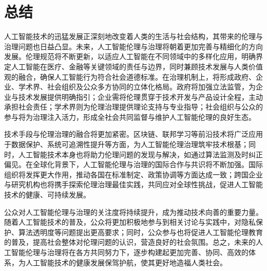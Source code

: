 \section{总结}

人工智能技术的迅猛发展正深刻地改变着人类的生活与社会结构，其带来的伦理与治理问题也日益凸显。未来，人工智能伦理与治理将朝着更加完善与精细化的方向发展。伦理规范将不断更新，以适应人工智能在不同领域中的多样化应用，明确界定人工智能在医疗、金融等关键领域的责任与边界，同时兼顾技术发展与人类价值观的融合，确保人工智能行为符合社会道德标准。在治理机制上，将形成政府、企业、学术界、社会组织及公众多方协同的立体化格局。政府将加强立法监管，为企业与技术发展提供明确指引；企业需将伦理贯穿于技术开发与产品设计全程，主动承担社会责任；学术界则为伦理治理提供理论支持与专业指导；社会组织与公众的参与将为治理注入活力，形成全社会共同监督与维护人工智能伦理的良好生态。

技术手段与伦理治理的融合将更加紧密。区块链、联邦学习等前沿技术将广泛应用于数据保护、系统可追溯性提升等方面，为人工智能伦理治理筑牢技术根基；同时，人工智能技术本身也将助力伦理问题的发现与解决，如通过算法监测及时纠正偏见。在全球化背景下，人工智能伦理与治理的国际合作与共识将不断加强。国际组织将发挥更大作用，推动各国在标准制定、政策协调等方面达成一致；跨国企业与研究机构也将携手探索伦理治理最佳实践，共同应对全球性挑战，促进人工智能技术的健康、可持续发展。

公众对人工智能伦理与治理的关注度将持续提升，成为推动技术向善的重要力量。随着人工智能技术的普及，公众将更加积极地参与到相关讨论与实践中，对隐私保护、算法透明度等问题提出更高要求；同时，公众参与也将促进人工智能伦理教育的普及，提高社会整体对伦理问题的认识，营造良好的社会氛围。总之，未来的人工智能伦理与治理将在各方共同努力下，逐步构建起更加完善、协同、高效的体系，为人工智能技术的健康发展保驾护航，使其更好地造福人类社会。

